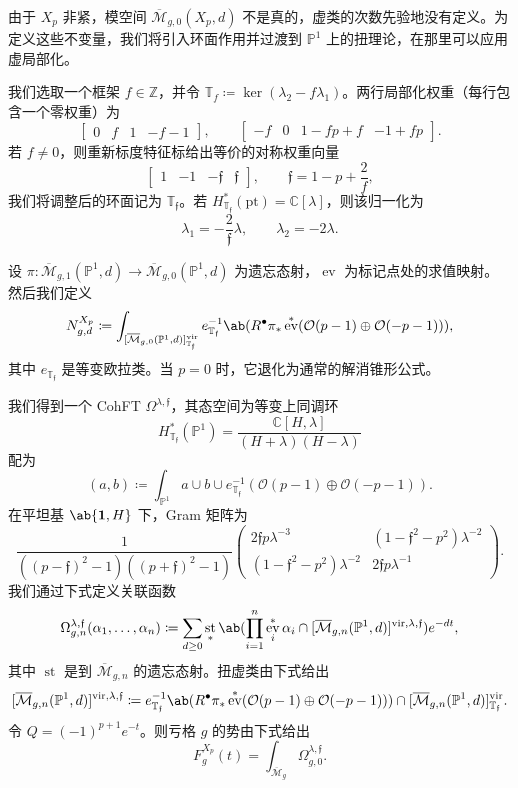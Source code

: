 \documentclass{amsart}
\theoremstyle{definition}
\theoremstyle{remark}
\theoremstyle{plain}
\theoremstyle{definition}
\theoremstyle{remark}
\newcommand{\C}{\mathbb{C}}
\newcommand{\Z}{\mathbb{Z}}
\renewcommand{\P}{\mathbb{P}}
\newcommand{\Mbar}{\overline{\mathcal{M}}}
\newcommand{\mc}[1]{\mathcal{#1}}
\newcommand{\T}{\mathbb{T}}
\newcommand{\mf}[1]{\mathfrak{#1}}
\newcommand{\mr}[1]{\mathrm{#1}}
\newcommand{\1}{\mathbf{1}}
\newcommand{\2}{\mathbf{2}}
\newcommand{\3}{\mathbf{3}}
\newcommand{\vir}{\mr{vir}}
\DeclareMathOperator{\ev}{ev}
\DeclareMathOperator{\st}{st}
\begin{document}
由于 \(X_p\) 非紧，模空间 \(\Mbar_{g,0}(X_p,d)\) 不是真的，虚类的次数先验地没有定义。为定义这些不变量，我们将引入环面作用并过渡到 \(\P^1\) 上的扭理论，在那里可以应用虚局部化。

我们选取一个框架 \(f \in \Z\)，并令 \(\T_f \coloneqq \ker(\lambda_2 - f\lambda_1)\)。两行局部化权重（每行包含一个零权重）为
\[ \begin{bmatrix} 0 & f & 1 & -f-1 \end{bmatrix}, \qquad \begin{bmatrix} -f & 0 & 1-fp+f & -1+fp \end{bmatrix}. \]
若 \(f \neq 0\)，则重新标度特征标给出等价的对称权重向量
\[ \begin{bmatrix} 1 & -1 & -\mf{f} & \mf{f} \end{bmatrix}, \qquad \mf{f} = 1-p+\frac{2}{f}, \]
我们将调整后的环面记为 \(\T_{\mf{f}}\)。若 \(H^*_{\T_{\mf{f}}}(\mr{pt}) = \C[\lambda]\)，则该归一化为
\[ \lambda_1 = -\frac{2}{\mf{f}}\lambda, \qquad \lambda_2 = -2\lambda. \]

设 \(\pi \colon \Mbar_{g,1}(\P^1,d) \to \Mbar_{g,0}(\P^1,d)\) 为遗忘态射，\(\ev\) 为标记点处的求值映射。然后我们定义
\[ N^{X_p}_{g,d} \coloneqq \int_{[\Mbar_{g,0}(\P^1,d)]^{\vir}_{\T_{\mf{f}}}} e_{\T_{\mf{f}}}^{-1}\ab(R^{\bullet}\pi_* \ev^*(\mc{O}(p-1)\oplus\mc{O}(-p-1))), \]
其中 \(e_{\T_{\mf{f}}}\) 是等变欧拉类。当 \(p=0\) 时，它退化为通常的解消锥形公式。

我们得到一个 CohFT \(\Omega^{\lambda,\mf{f}}\)，其态空间为等变上同调环
\[ H^*_{\T_{\mf{f}}}(\P^1) = \frac{\C[H,\lambda]}{(H+\lambda)(H-\lambda)} \]
配为
\[ (a,b) \coloneqq \int_{\P^1} a \cup b \cup e^{-1}_{\T_{\mf{f}}}(\mc{O}(p-1)\oplus\mc{O}(-p-1)). \]
在平坦基 \(\ab\{\1,H\}\) 下，Gram 矩阵为
\[ \frac{1}{((p-\mf{f})^2-1)((p+\mf{f})^2-1)}\begin{pmatrix} 2\mf{f}p\lambda^{-3} & (1-\mf{f}^2-p^2)\lambda^{-2} \\ (1-\mf{f}^2-p^2)\lambda^{-2} & 2\mf{f}p\lambda^{-1} \end{pmatrix}. \]
我们通过下式定义关联函数
\[ \Omega^{\lambda,\mf{f}}_{g,n}(\alpha_1,\ldots,\alpha_n) \coloneqq \sum_{d\geq0}\st_*\ab(\prod_{i=1}^n \ev_i^*\alpha_i \cap [\Mbar_{g,n}(\P^1,d)]^{\vir,\lambda,\mf{f}})e^{-dt}, \]
其中 \(\st\) 是到 \(\Mbar_{g,n}\) 的遗忘态射。扭虚类由下式给出
\[ [\Mbar_{g,n}(\P^1,d)]^{\vir,\lambda,\mf{f}} \coloneqq e^{-1}_{\T_{\mf{f}}}\ab(R^{\bullet}\pi_*\ev^*(\mc{O}(p-1)\oplus\mc{O}(-p-1))) \cap [\Mbar_{g,n}(\P^1,d)]^{\vir}_{\T_{\mf{f}}}. \]
令 \(Q = (-1)^{p+1}e^{-t}\)。则亏格 \(g\) 的势由下式给出
\[ F^{X_p}_g(t) = \int_{\Mbar_g} \Omega^{\lambda,\mf{f}}_{g,0}. \]
\end{document}
